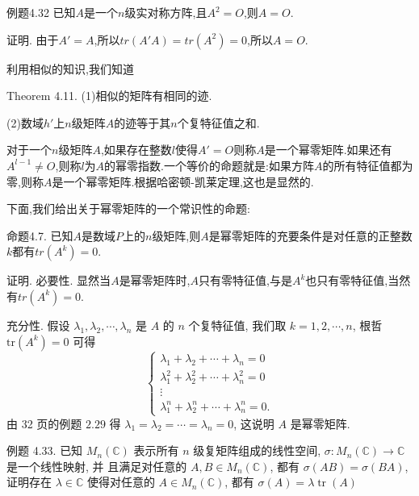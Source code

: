 \documentclass{article}
\begin{document}
\vspace{1ex}
{\heiti 例题4.32} {\kaishu 已知$A$是一个$n$级实对称方阵,且$A^2 = O$,则$A = O$.}

{\heiti 证明.} 由于$A' = A$,所以$tr \left(A'A\right) = tr \left(A^2\right) = 0$,所以$A = O$.

利用相似的知识,我们知道

{\heiti Theorem 4.11.} (1)相似的矩阵有相同的迹.

(2)数域$h'$上$n$级矩阵$A$的迹等于其$n$个复特征值之和.

\vspace{1ex}
对于一个$n$级矩阵$A$,如果存在整数$l$使得$A' = O$则称$A$是一个幂零矩阵.如果还有$A^{l - 1} \neq O$,则称$l$为$A$的幂零指数.一个等价的命题就是:如果方阵$A$的所有特征值都为零,则称$A$是一个幂零矩阵.根据哈密顿-凯莱定理,这也是显然的.

下面,我们给出关于幂零矩阵的一个常识性的命题:

\vspace{1ex}
{\heiti 命题4.7.} {\kaishu 已知$A$是数域$P$上的$n$级矩阵,则$A$是幂零矩阵的充要条件是对任意的正整数$k$都有$tr \left(A^k\right) = 0$.}

{\heiti 证明.} 必要性. 显然当$A$是幂零矩阵时,$A$只有零特征值,与是$A^k$也只有零特征值,当然有$tr \left(A^k\right) = 0$.

充分性. 假设 $\lambda_{1}, \lambda_{2}, \cdots, \lambda_{n}$ 是 $A$ 的 $n$ 个复特征值, 我们取 $k=1,2, \cdots, n$, 根哲 $\mathrm{tr}\left(A^k\right) = 0$ 可得
\begin{equation*}
    \left\{\begin{array}{c}
        \lambda_{1}+\lambda_{2}+\cdots+\lambda_{n}=0             \\
        \lambda_{1}^{2}+\lambda_{2}^{2}+\cdots+\lambda_{n}^{2}=0 \\
        \vdots                                                   \\
        \lambda_{1}^{n}+\lambda_{2}^{n}+\cdots+\lambda_{n}^{n}=0.
    \end{array}\right.
\end{equation*}
由 32 页的例题 $2.29$ 得 $\lambda_{1}=\lambda_{2}=\cdots=\lambda_{n}=0$, 这说明 $A$ 是幂零矩阵.

\vspace{1ex}
{\heiti 例题 4.33.} {\kaishu 已知 $M_{n}(\mathbb{C})$ 表示所有 $n$ 级复矩阵组成的线性空间, $\sigma: M_{n}(\mathbb{C}) \longrightarrow \mathbb{C}$ 是一个线性映射, 并 且满足对任意的 $A, B \in M_{n}(\mathbb{C})$, 都有 $\sigma(A B)=\sigma(B A)$, 证明存在 $\lambda \in \mathbb{C}$ 使得对任意的 $A \in M_{n}(\mathbb{C})$, 都有
    $\sigma(A)=\lambda \operatorname{tr}(A)$}
\end{document}
